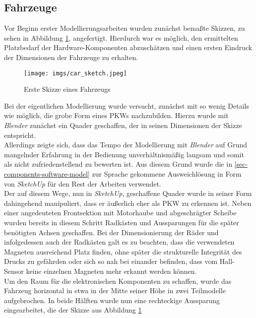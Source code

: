 \documentclass[.../Dokumentation.tex]{subfiles}
\begin{document}
\subsection{Fahrzeuge}\label{sec-ita1-cars}
Vor Beginn erster Modellierungsarbeiten wurden zunächst bemaßte Skizzen, 
zu sehen in Abbildung \ref{fig-car-sketch}, angefertigt. 
Hierdurch war es möglich, den ermittelten Platzbedarf der Hardware-Komponenten abzuschätzen und einen ersten Eindruck der Dimensionen der 
Fahrzeuge zu erhalten.\\
\begin{figure}[H]
    \begin{center}
    \texttt{[image: imgs/car\_sketch.jpeg]}
    \caption{Erste Skizze eines Fahrzeugs}
    \label{fig-car-sketch}
\end{center}
\end{figure}
\noindent
Bei der eigentlichen Modellierung wurde versucht, zunächst mit so wenig 
Details wie möglich, die grobe Form eines PKWs nachzubilden. Hierzu wurde mit 
\textit{Blender} zunächst ein Quader geschaffen, der in seinen Dimensionen 
der Skizze entspricht.\\
Allerdings zeigte sich, dass das Tempo der Modellierung mit \textit{Blender} 
auf Grund mangelnder Erfahrung in der Bedienung unverhältnismäßig langsam und 
somit als nicht zufriedenstellend zu bewerten ist.
Aus diesem Grund wurde die in 
\ref{sec-components-software-model} zur Sprache gekommene Ausweichlösung in 
Form von \textit{SketchUp} für den Rest der Arbeiten verwendet.\\
Der auf diesem Wege, nun in \textit{SketchUp}, geschaffene Quader wurde in 
seiner Form dahingehend manipuliert, dass er äußerlich eher als PKW zu erkennen 
ist. Neben einer angedeuteten Frontsektion mit Motorhaube und abgeschrägter 
Scheibe wurden bereits in diesem Schritt Radkästen und Aussparungen für die 
später benötigten Achsen geschaffen. 
Bei der Dimensionierung der Räder und infolgedessen auch der Radkästen galt 
es zu beachten, dass die verwendeten Magneten ausreichend Platz finden, 
ohne später die strukturelle Integrität des Drucks zu gefährden oder sich so 
nah bei einander befinden, dass vom Hall-Sensor keine einzelnen Magneten 
mehr erkannt werden können.\\
Um den Raum für die elektronischen Komponenten zu schaffen, wurde das Fahrzeug 
horizontal in etwa in der Mitte seiner Höhe in zwei Teilmodelle aufgebrochen.
In beide Hälften wurde nun eine rechteckige 
Aussparung eingearbeitet, die der Skizze aus Abbildung \ref{fig-car-sketch} 
\end{document}
